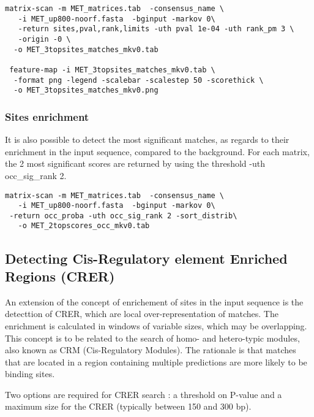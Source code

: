 {\color{Blue} \begin{footnotesize} 
\begin{verbatim}
matrix-scan -m MET_matrices.tab  -consensus_name \
   -i MET_up800-noorf.fasta  -bginput -markov 0\
   -return sites,pval,rank,limits -uth pval 1e-04 -uth rank_pm 3 \
   -origin -0 \
  -o MET_3topsites_matches_mkv0.tab

 feature-map -i MET_3topsites_matches_mkv0.tab \
  -format png -legend -scalebar -scalestep 50 -scorethick \
  -o MET_3topsites_matches_mkv0.png    

\end{verbatim} \end{footnotesize}
}

\subsubsection{Sites enrichment}
It is also possible to detect the most significant matches, as regards to their enrichment in the input sequence, compared to the background. For each matrix, the 2 most significant scores are returned by using the threshold -uth occ\_sig\_rank 2.


{\color{Blue} \begin{footnotesize} 
\begin{verbatim}
matrix-scan -m MET_matrices.tab  -consensus_name \
   -i MET_up800-noorf.fasta  -bginput -markov 0\
 -return occ_proba -uth occ_sig_rank 2 -sort_distrib\
   -o MET_2topscores_occ_mkv0.tab

\end{verbatim} \end{footnotesize}
}


\subsection{Detecting Cis-Regulatory element Enriched Regions (CRER)}
An extension of the concept of enrichement of sites in the input sequence is the detecttion of CRER, which are local over-representation of matches. The enrichment is calculated in windows of variable sizes, which may be overlapping. This concept is to be related to the search of homo- and hetero-typic modules, also known as CRM (Cis-Regulatory Modules). The rationale is that matches that are located in a region containing multiple predictions are more likely to be binding sites. 

Two options are required for CRER search : a threshold on P-value and a maximum size for the CRER (typically between 150 and 300 bp).

